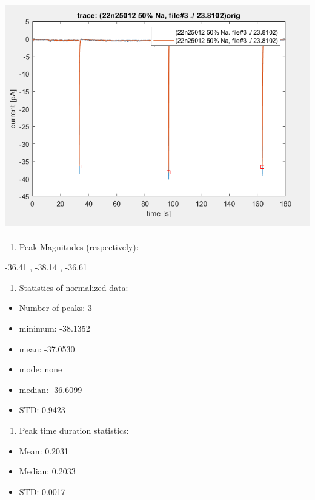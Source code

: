 \includegraphics[width=5.42188in,height=3.91684in]{media/image23.png}

\begin{enumerate}
\def\labelenumi{\arabic{enumi}.}
\item
  Peak Magnitudes (respectively):
\end{enumerate}

-36.41 , -38.14 , -36.61

\begin{enumerate}
\def\labelenumi{\arabic{enumi}.}
\setcounter{enumi}{1}
\item
  Statistics of normalized data:
\end{enumerate}

\begin{itemize}
\item
  Number of peaks: 3
\item
  minimum: -38.1352
\item
  mean: -37.0530
\item
  mode: none
\item
  median: -36.6099
\item
  STD: 0.9423
\end{itemize}

\begin{enumerate}
\def\labelenumi{\arabic{enumi}.}
\setcounter{enumi}{2}
\item
  Peak time duration statistics:
\end{enumerate}

\begin{itemize}
\item
  Mean: 0.2031
\item
  Median: 0.2033
\item
  STD: 0.0017
\end{itemize}

